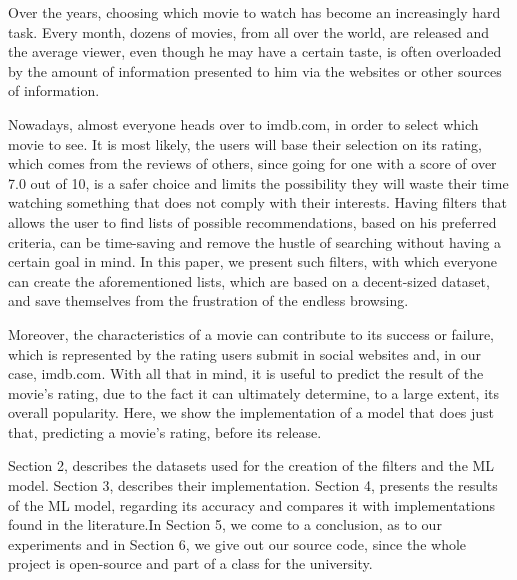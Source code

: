 \documentclass[letterpaper,twocolumn,10pt]{article}
\begin{document}
\par Over the years, choosing which movie to watch has become an increasingly hard task. Every month, dozens of movies, from all over the world, are released and the average viewer, even though he may have a certain taste, is often overloaded by the amount of information presented to him via the websites or other sources of information. 
\par Nowadays, almost everyone heads over to imdb.com, in order to select which movie to see. It is most likely, the users will base their selection on its rating, which comes from the reviews of others, since going for one with a score of over 7.0 out of 10, is a safer choice and limits the possibility they will waste their time watching something that does not comply with their interests. Having filters that allows the user to find lists of possible recommendations, based on his preferred criteria, can be time-saving and remove the hustle of searching without having a certain goal in mind. In this paper, we present such filters, with which everyone can create the aforementioned lists, which are based on a decent-sized dataset, and save themselves from the frustration of the endless browsing.
\par Moreover, the characteristics of a movie can contribute to its success or failure, which is represented by the rating users submit in social websites and, in our case, imdb.com. With all that in mind, it is useful to predict the result of the movie’s rating, due to the fact it can ultimately determine, to a large extent, its overall popularity. Here, we show the implementation of a model that does just that, predicting a movie's rating, before its release.
\par Section 2, describes the datasets used for the creation of the filters and the ML model. Section 3, describes their implementation. Section 4, presents the results of the ML model, regarding its accuracy and compares it with implementations found in the literature.In Section 5, we come to a conclusion, as to our experiments and in Section 6, we give out our source code, since the whole project is open-source and part of a class for the university.
\end{document}
